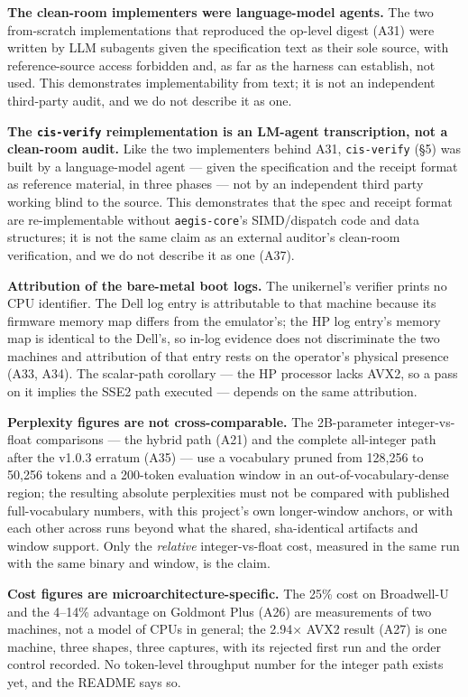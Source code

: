 \documentclass[11pt]{article}
\begin{document}
\textbf{The clean-room implementers were language-model agents.} The two from-scratch implementations
that reproduced the op-level digest (A31) were written by LLM subagents given the specification
text as their sole source, with reference-source access forbidden and, as far as the harness can
establish, not used. This demonstrates implementability from text; it is not an independent
third-party audit, and we do not describe it as one.

\textbf{The \texttt{cis-verify} reimplementation is an LM-agent transcription, not a clean-room audit.} Like
the two implementers behind A31, \texttt{cis-verify} (§5) was built by a language-model agent --- given the
specification and the receipt format as reference material, in three phases --- not by an
independent third party working blind to the source. This demonstrates that the spec and receipt
format are re-implementable without \texttt{aegis-core}'s SIMD/dispatch code and data structures; it is
not the same claim as an external auditor's clean-room verification, and we do not describe it as
one (A37).

\textbf{Attribution of the bare-metal boot logs.} The unikernel's verifier prints no CPU identifier.
The Dell log entry is attributable to that machine because its firmware memory map differs from
the emulator's; the HP log entry's memory map is identical to the Dell's, so in-log evidence does
not discriminate the two machines and attribution of that entry rests on the operator's physical
presence (A33, A34). The scalar-path corollary --- the HP processor lacks AVX2, so a pass on it
implies the SSE2 path executed --- depends on the same attribution.

\textbf{Perplexity figures are not cross-comparable.} The 2B-parameter integer-vs-float comparisons ---
the hybrid path (A21) and the complete all-integer path after the v1.0.3 erratum (A35) --- use a
vocabulary pruned from 128,256 to 50,256 tokens and a 200-token evaluation window in an
out-of-vocabulary-dense region; the resulting absolute perplexities must not be compared with
published full-vocabulary numbers, with this project's own longer-window anchors, or with each
other across runs beyond what the shared, sha-identical artifacts and window support. Only the
\emph{relative} integer-vs-float cost, measured in the same run with the same binary and window, is the
claim.

\textbf{Cost figures are microarchitecture-specific.} The 25\% cost on Broadwell-U and the 4--14\%
advantage on Goldmont Plus (A26) are measurements of two machines, not a model of CPUs in
general; the 2.94× AVX2 result (A27) is one machine, three shapes, three captures, with its
rejected first run and the order control recorded. No token-level throughput number for the
integer path exists yet, and the README says so.
\end{document}
